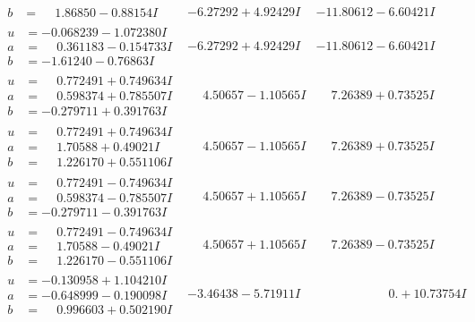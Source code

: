 \documentclass[1p]{elsarticle_modified}
\theoremstyle{definition}
\begin{document}
$$\begin{array}{c|c|c}
\begin{aligned}
b &= \phantom{-}1.86850 - 0.88154 I\end{aligned}
 & -6.27292 + 4.92429 I & -11.80612 - 6.60421 I \\ \hline\begin{aligned}
u &= -0.068239 - 1.072380 I \\
a &= \phantom{-}0.361183 - 0.154733 I \\
b &= -1.61240 - 0.76863 I\end{aligned}
 & -6.27292 + 4.92429 I & -11.80612 - 6.60421 I \\ \hline\begin{aligned}
u &= \phantom{-}0.772491 + 0.749634 I \\
a &= \phantom{-}0.598374 + 0.785507 I \\
b &= -0.279711 + 0.391763 I\end{aligned}
 & \phantom{-}4.50657 - 1.10565 I & \phantom{-}7.26389 + 0.73525 I \\ \hline\begin{aligned}
u &= \phantom{-}0.772491 + 0.749634 I \\
a &= \phantom{-}1.70588 + 0.49021 I \\
b &= \phantom{-}1.226170 + 0.551106 I\end{aligned}
 & \phantom{-}4.50657 - 1.10565 I & \phantom{-}7.26389 + 0.73525 I \\ \hline\begin{aligned}
u &= \phantom{-}0.772491 - 0.749634 I \\
a &= \phantom{-}0.598374 - 0.785507 I \\
b &= -0.279711 - 0.391763 I\end{aligned}
 & \phantom{-}4.50657 + 1.10565 I & \phantom{-}7.26389 - 0.73525 I \\ \hline\begin{aligned}
u &= \phantom{-}0.772491 - 0.749634 I \\
a &= \phantom{-}1.70588 - 0.49021 I \\
b &= \phantom{-}1.226170 - 0.551106 I\end{aligned}
 & \phantom{-}4.50657 + 1.10565 I & \phantom{-}7.26389 - 0.73525 I \\ \hline\begin{aligned}
u &= -0.130958 + 1.104210 I \\
a &= -0.648999 - 0.190098 I \\
b &= \phantom{-}0.996603 + 0.502190 I\end{aligned}
 & -3.46438 - 5.71911 I & \phantom{-0.000000 -}0. + 10.73754 I \\ \hline\begin{aligned}

\end{aligned}
\end{array}$$
\end{document}
